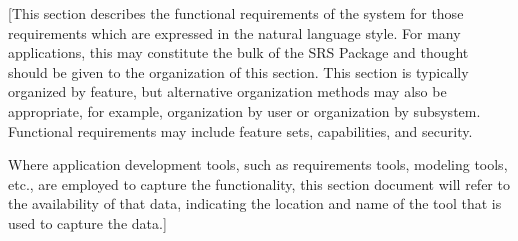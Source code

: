 [This section describes the functional requirements 
of the system for those requirements which are 
expressed in the natural language style. For many
applications, this may constitute the bulk of 
the SRS Package and thought should be given to 
the organization of this section. This section 
is typically organized by feature, but alternative
organization methods may also be appropriate, 
for example, organization by user or organization 
by subsystem.  Functional requirements may include 
feature sets, capabilities, and security.

Where application development tools, such as requirements 
tools, modeling tools, etc., are employed to capture the 
functionality, this section document will refer to the 
availability of that data, indicating the location and 
name of the tool that is used to capture the data.]